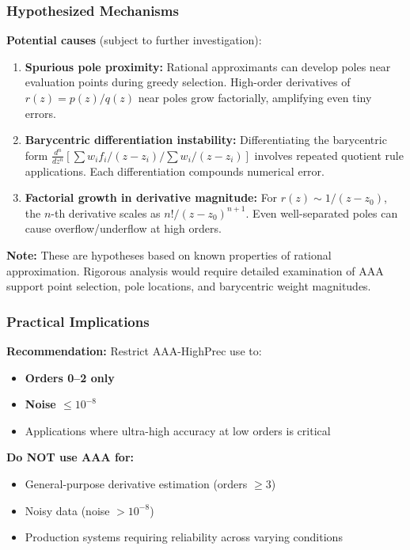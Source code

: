 \subsubsection{Hypothesized Mechanisms}

\textbf{Potential causes} (subject to further investigation):

\begin{enumerate}
    \item \textbf{Spurious pole proximity:}
    Rational approximants can develop poles near evaluation points during greedy selection. High-order derivatives of $r(z) = p(z)/q(z)$ near poles grow factorially, amplifying even tiny errors.

    \item \textbf{Barycentric differentiation instability:}
    Differentiating the barycentric form $\frac{d^n}{dz^n} \left[\sum w_i f_i/(z-z_i) / \sum w_i/(z-z_i)\right]$ involves repeated quotient rule applications. Each differentiation compounds numerical error.

    \item \textbf{Factorial growth in derivative magnitude:}
    For $r(z) \sim 1/(z-z_0)$, the $n$-th derivative scales as $n!/(z-z_0)^{n+1}$. Even well-separated poles can cause overflow/underflow at high orders.
\end{enumerate}

\textbf{Note:} These are hypotheses based on known properties of rational approximation. Rigorous analysis would require detailed examination of AAA support point selection, pole locations, and barycentric weight magnitudes.

\subsubsection{Practical Implications}

\textbf{Recommendation:} Restrict AAA-HighPrec use to:
\begin{itemize}
    \item \textbf{Orders 0--2 only}
    \item \textbf{Noise $\leq 10^{-8}$}
    \item Applications where ultra-high accuracy at low orders is critical
\end{itemize}

\textbf{Do NOT use AAA for:}
\begin{itemize}
    \item General-purpose derivative estimation (orders $\geq 3$)
    \item Noisy data (noise $> 10^{-8}$)
    \item Production systems requiring reliability across varying conditions
\end{itemize}


